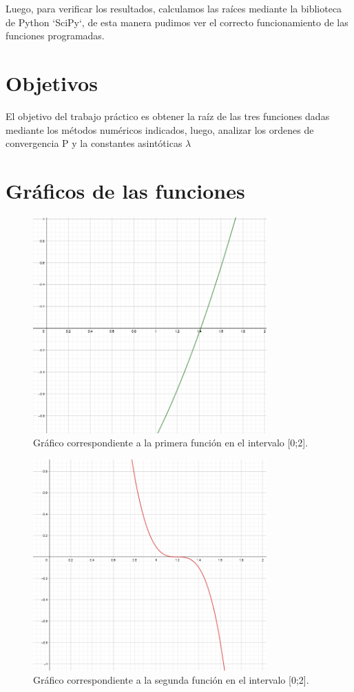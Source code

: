\documentclass[titlepage,a4paper]{article}
\begin{document}
Luego, para verificar los resultados, calculamos las raíces mediante la biblioteca de Python `SciPy`, de esta manera pudimos ver el correcto funcionamiento de las funciones programadas.

\section{Objetivos}\label{sec:objetivos}
El objetivo del trabajo práctico es obtener la raíz de las tres funciones dadas mediante los métodos numéricos indicados, luego, analizar los ordenes de convergencia P y la constantes asintóticas $\lambda$


\section{Gráficos de las funciones}\label{sec:graficosfun}

\begin{figure}[H]
\centering
\includegraphics[width=0.8\textwidth]{funcion1.png}
\caption{\label{fig:class01}Gráfico correspondiente a la primera función en el intervalo [0;2].}
\end{figure}

\begin{figure}[H]
\centering
\includegraphics[width=0.8\textwidth]{funcion2.png}
\caption{\label{fig:class01}Gráfico correspondiente a la segunda función en el intervalo [0;2].}
\end{figure}
\end{document}
